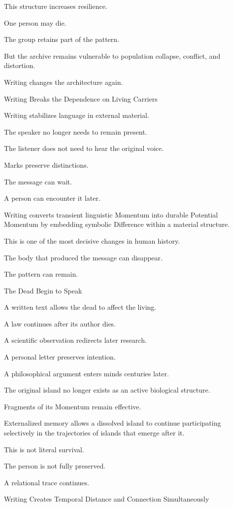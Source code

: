 This structure increases resilience.

One person may die.

The group retains part of the pattern.

But the archive remains vulnerable to population collapse, conflict, and distortion.

Writing changes the architecture again.

Writing Breaks the Dependence on Living Carriers

Writing stabilizes language in external material.

The speaker no longer needs to remain present.

The listener does not need to hear the original voice.

Marks preserve distinctions.

The message can wait.

A person can encounter it later.

Writing converts transient linguistic Momentum into durable Potential Momentum by embedding symbolic Difference within a material structure.

This is one of the most decisive changes in human history.

The body that produced the message can disappear.

The pattern can remain.

The Dead Begin to Speak

A written text allows the dead to affect the living.

A law continues after its author dies.

A scientific observation redirects later research.

A personal letter preserves intention.

A philosophical argument enters minds centuries later.

The original island no longer exists as an active biological structure.

Fragments of its Momentum remain effective.

Externalized memory allows a dissolved island to continue participating selectively in the trajectories of islands that emerge after it.

This is not literal survival.

The person is not fully preserved.

A relational trace continues.

Writing Creates Temporal Distance and Connection Simultaneously

